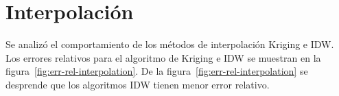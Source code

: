 \documentclass[a4paper,11pt]{book}
\begin{document}
\section{Interpolación}
Se analizó el comportamiento de los métodos de interpolación Kriging e IDW. Los errores relativos para el algoritmo de Kriging e IDW se muestran en la figura~\ref{fig:err-rel-interpolation}. De la figura~\ref{fig:err-rel-interpolation} se desprende que los algoritmos IDW tienen menor error relativo.
\end{document}
